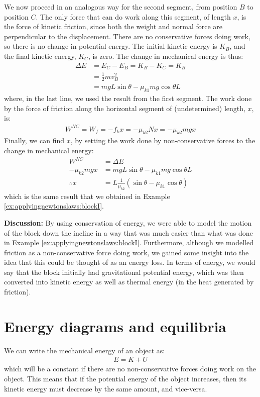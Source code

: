 \begin{example}
We now proceed in an analogous way for the second segment, from position $B$ to position $C$. The only force that can do work along this segment, of length $x$, is the force of kinetic friction, since both the weight and normal force are perpendicular to the displacement. There are no conservative forces doing work, so there is no change in potential energy. The initial kinetic energy is $K_B$, and the final kinetic energy, $K_C$, is zero. The change in mechanical energy is thus:
\begin{align*}
\Delta E &= E_C - E_B = K_B - K_C = K_B\\
&=\frac{1}{2}mv_B^2\\
&= mgL\sin\theta-\mu_{k1}mg\cos\theta L 
\end{align*}
where, in the last line, we used the result from the first segment. The work done by the force of friction along the horizontal segment of (undetermined) length, $x$, is:
\begin{align*}
W^{NC}=W_f = -f_kx = -\mu_{k2} N x=-\mu_{k2} mg x
\end{align*}
Finally, we can find $x$, by setting the work done by non-conservative forces to the change in mechanical energy:
\begin{align*}
W^{NC} &= \Delta E\\
-\mu_{k2} mg x &= mgL\sin\theta-\mu_{k1}mg\cos\theta L \\
\therefore x&= L\frac{1}{\mu_{k2}}\left(\sin\theta - \mu_{k1}\cos\theta\right)
\end{align*}
which is the same result that we obtained in Example \ref{ex:applyingnewtonslaws:blockI}.

\textbf{Discussion:} By using conservation of energy, we were able to model the motion of the block down the incline in a way that was much easier than what was done in Example \ref{ex:applyingnewtonslaws:blockI}. Furthermore, although we modelled friction as a non-conservative force doing work, we gained some insight into the idea that this could be thought of as an energy loss. In terms of energy, we would say that the block initially had gravitational potential energy, which was then converted into kinetic energy as well as thermal energy (in the heat generated by friction). 
\end{example}

\section{Energy diagrams and equilibria}
We can write the mechanical energy of an object as:
\begin{align*}
E = K + U
\end{align*}
which will be a constant if there are no non-conservative forces doing work on the object. This means that if the potential energy of the object increases, then its kinetic energy must decrease by the same amount, and vice-versa. 

